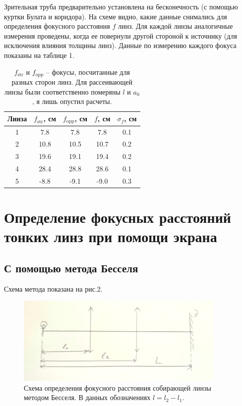 \documentclass[a4paper, 14pt]{extarticle}%
\newcommand\ECaption[1]{%
     \captionsetup{font=footnotesize}%
     \caption{#1}}
\begin{document}
Зрительная труба предварительно установлена на бесконечность (с помощью куртки Булата и коридора). На схеме видно, какие данные снимались для определения фокусного расстояния $f$ линз. Для каждой линзы аналогичные измерения проведены, когда ее повернули другой стороной к источнику (для исключения влияния толщины линз). Данные по измерению каждого фокуса показаны на таблице 1.

\begin{table}[h!]
\begin{center}
\begin{tabular}{|c|c|c|c|c|}
\hline
\rowcolor[HTML]{9698ED} 
Линза & $f_{\text{str}}$, см & $f_{\text{opp}}$, см & $f$, см & $\sigma_f$, см \\ \hline
1     & 7.8           & 7.8           & 7.8     & 0.1            \\ \hline
\rowcolor[HTML]{9698ED} 
2     & 10.8            & 10.5            & 10.7    & 0.2            \\ \hline
3     & 19.6            & 19.1          & 19.4    & 0.2            \\ \hline
\rowcolor[HTML]{9698ED} 
4     & 28.4          & 28.8          & 28.6    & 0.1            \\ \hline
5     & -8.8          & -9.1          & -9.0    & 0.3            \\ \hline
\end{tabular}
\ECaption{$ f_{\text{str}} $ и $ f_{\text{opp}} $ -- фокусы, посчитанные для разных сторон линз. Для рассеивающей линзы были соответственно померяны $l$ и $a_0$, я лишь опустил расчеты.}
\end{center}
\end{table}

\newpage
\section{Определение фокусных расстояний тонких линз при помощи экрана}

\subsection{С помощью метода Бесселя}

Схема метода показана на рис.2. 

\begin{figure}[h!]
\begin{center}
\includegraphics[width=0.9\textwidth]{2}
\end{center}
\ECaption{Схема определения фокусного расстояния собирающей линзы методом Бесселя. В данных обозначениях $l = l_2-l_1$. }
\end{figure}
\end{document}
